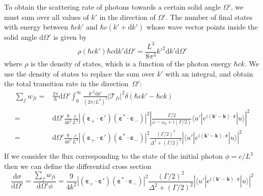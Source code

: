 \documentclass[11pt,letter]{article}
\newcommand{\bv}[1]{\ensuremath{\bm{#1}}}
\begin{document}
To obtain the scattering rate of photons towards a certain solid angle
$\Omega'$, we must sum over all values of $k'$ in the direction of $\Omega'$.
The number of final states with energy between $\hbar c k'$ and $\hbar c ( k' +
\mathrm{d}k')$  whose wave vector points inside the solid angle $\mathrm{d}
\Omega'$ is given by 
\begin{equation}
    \rho( \hbar c k') \hbar c \mathrm{d} k' \mathrm{d} \Omega ' 
  = \frac{L^{3}}{8 \pi^{3} }  k'^{2} \mathrm{d} k' \mathrm{d} \Omega' 
\end{equation}
where $\rho$ is the density of states, which is a function of the photon energy
$\hbar c k$.  We use the density of states to replace the sum over $k'$ with an
integral,  and obtain the total transition rate in the direction~$\Omega'$: 
\begin{equation}
\begin{split}
  \sum_{f} w_{fi} = & 
   \frac{2\pi}{\hbar}  \mathrm{d} \Omega' 
      \int_{0}^{\infty} \frac{k'^{2} \mathrm{d} k' }{ (2\pi / L^{3} ) ^{3} } 
   | \mathcal{T}_{fi} |^{2} 
   \delta( \hbar c k' - \hbar c k )  \\ 
   = & 
   \mathrm{d} \Omega' \frac{9}{4 k^{2}} \frac{ c } {L^{3} }
        |(\bv{\varepsilon}_{+}\cdot \bv{\varepsilon}' )
                       (\bv{\varepsilon}^{*}\cdot \bv{\varepsilon}_{-} ) |^{2}
    \left|
    \frac{ \Gamma/2  }
        { \omega - \omega_{0} + i (\Gamma/2 ) }  
      \langle u' | e^{i(\bv{k}'-\bv{k}) \cdot\bv{r}} | u  \rangle
     \right| ^{2} \\ 
   = & 
   \mathrm{d} \Omega' \frac{9}{4 k^{2}} \frac{ c } {L^{3} }
        |(\bv{\varepsilon}_{+}\cdot \bv{\varepsilon}' )
                       (\bv{\varepsilon}^{*}\cdot \bv{\varepsilon}_{-} ) |^{2}
    \frac{ (\Gamma/2)^{2}  }
        { \Delta^{2} +  (\Gamma/2 )^{2} }
    \left|
      \langle u' | e^{i(\bv{k}'-\bv{k}) \cdot\bv{r}} | u  \rangle
\right| ^{2} \\ 
\end{split} 
\end{equation}
If we consider the flux corresponding to the state of the initial photon $\phi
= c/L^{3}$ then we can define the differential cross section 
\begin{equation}
 \frac{ \mathrm{d} \sigma } { \mathrm{d} \Omega'} =  
    \frac{\sum_{f} w_{fi} } { \mathrm{d} \Omega' \phi} = 
    \frac{9}{4 k^{2}} 
        |(\bv{\varepsilon}_{+}\cdot \bv{\varepsilon}' )
                       (\bv{\varepsilon}^{*}\cdot \bv{\varepsilon}_{-} ) |^{2}
    \frac{ (\Gamma/2)^{2}  }
        { \Delta^{2} +  (\Gamma/2 )^{2} }
    \left|
      \langle u' | e^{i(\bv{k}'-\bv{k}) \cdot\bv{r}} | u  \rangle
\right| ^{2}  
\end{equation}
\end{document}
